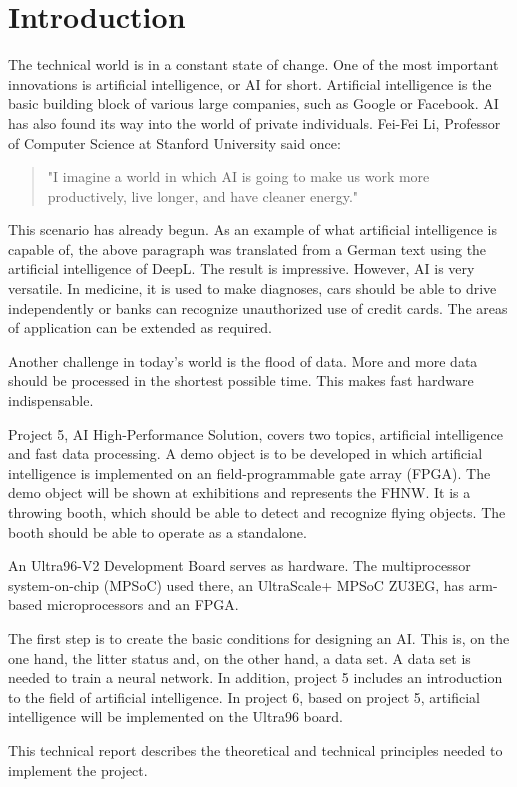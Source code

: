 \section{Introduction}
\label{sec:introduction}
The technical world is in a constant state of change. One of the most important innovations is artificial intelligence, or AI for short.
Artificial intelligence is the basic building block of various large companies, such as Google or Facebook.
AI has also found its way into the world of private individuals.
Fei-Fei Li, Professor of Computer Science at Stanford University said once:
\begin{quote}
	"I imagine a world in which AI is going to make us work more productively, live longer, and have cleaner energy."\cite{QuotesFuture}
\end{quote}
This scenario has already begun. As an example of what artificial intelligence is capable of, the above paragraph was translated from a German text using the artificial intelligence of DeepL. The result is impressive.
However, AI is very versatile. In medicine, it is used to make diagnoses, cars should be able to drive independently or banks can recognize unauthorized use of credit cards\cite{ArtificialIntelligenceAModernApproach}. 
The areas of application can be extended as required.

Another challenge in today's world is the flood of data. More and more data should be processed in the shortest possible time. This makes fast hardware indispensable.

Project 5, AI High-Performance Solution, covers two topics, artificial intelligence and fast data processing.
A demo object is to be developed in which artificial intelligence is implemented on an field-programmable gate array (FPGA).
The demo object will be shown at exhibitions and represents the FHNW.
It is a throwing booth, which should be able to detect and recognize flying objects.
The booth should be able to operate as a standalone.

An Ultra96-V2 Development Board serves as hardware.
The multiprocessor system-on-chip (MPSoC) used there, an UltraScale+ MPSoC ZU3EG, has arm-based microprocessors and an FPGA.

The first step is to create the basic conditions for designing an AI.
This is, on the one hand, the litter status and, on the other hand, a data set. A data set is needed to train a neural network.
In addition, project 5 includes an introduction to the field of artificial intelligence.
In project 6, based on project 5, artificial intelligence will be implemented on the Ultra96 board.

This technical report describes the theoretical and technical principles needed to implement the project.